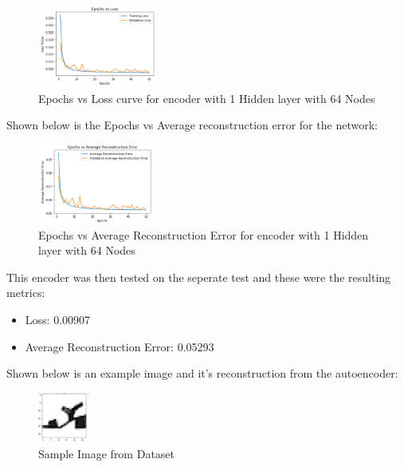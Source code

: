 \documentclass[conference]{IEEEtran}
\begin{document}
    \begin{figure}[H]
        \centering
        \captionsetup{justification=centering}
        \centering
            \includegraphics[width=0.35\textwidth]{8.png}
            \caption{Epochs vs Loss curve for encoder with 1 Hidden layer with 64 Nodes}
    \end{figure}

    Shown below is the Epochs vs Average reconstruction error for the network:

    \begin{figure}[H]
        \centering
        \captionsetup{justification=centering}
        \centering
            \includegraphics[width=0.35\textwidth]{9.png}
            \caption{Epochs vs Average Reconstruction Error for encoder with 1 Hidden layer with 64 Nodes}
    \end{figure}

    This encoder was then tested on the seperate test and these were the resulting metrics:

    \begin{itemize}
        \item Loss: 0.00907
        \item Average Reconstruction Error: 0.05293\\
    \end{itemize}

    Shown below is an example image and it's reconstruction from the autoencoder:

    \begin{figure}[H]
        \centering
        \captionsetup{justification=centering}
        \centering
            \includegraphics[width=0.15\textwidth]{10.png}
            \caption{Sample Image from Dataset}
    \end{figure}
\end{document}
